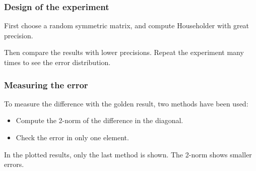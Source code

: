 \documentclass[serif, 12pt]{beamer}
\begin{document}

\begin{frame}
\frametitle{Design of the experiment}

First choose a random symmetric matrix, and compute Householder with great 
precision.

Then compare the results with lower precisions. Repeat the experiment many times 
to see the error distribution.

\vspace{1em}

\begin{algorithmic}[0]
\ENDFOR
\ENDFOR
\end{algorithmic}
\end{frame}


\begin{frame}
\frametitle{Measuring the error}

To measure the difference with the golden result, two methods have been used:

\begin{itemize}
\item Compute the 2-norm of the difference in the diagonal.
\item Check the error in only one element.
\end{itemize}

In the plotted results, only the last method is shown. The 2-norm shows smaller 
errors.

\end{frame}

\end{document}
